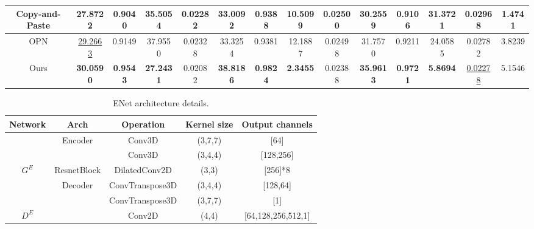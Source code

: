 \begin{table}[t]
{\begin{tabular}{c|c|c|c|c|c|c|c|c|c|c|c|c|c }
			Copy-and-Paste \cite{lee2019copy}&
			27.8722 &   0.9040 &  35.5054 & 0.02282 &
			
			33.0092 &  0.9388 &  10.5099 & 0.02500 & 
			
			30.2559 & 0.9106 & 31.3721 & 0.02968 
			& 1.4741
			\\
			
			\hline
			
			
			OPN \cite{oh2019onion} & \underline{29.2663} &0.9149 & 37.9550 &0.02328 &
			
			33.3254 & 0.9381  & 12.1887 &0.02498 &
			
			31.7570  & 0.9211 & 24.0585 
			&0.02782 &
			3.8239 \\
			
			
			\hline
			
			
			
			Ours &\textbf{30.0590} &\textbf{0.9543}&   \textbf{27.2431} & 0.02082 &
			\textbf{38.8186} & \textbf{0.9824} & \textbf{2.3455} & 0.02388 &
			\textbf{35.9613}  & \textbf{0.9721}&  \textbf{ 5.8694}  & \underline{0.02278}  &5.1546\\
			
			\hline
		\end{tabular}
	}
	\label{tab:sem}
\end{table}


\begin{table}[t]
	\caption{ENet architecture details. }\smallskip
	\scriptsize
	\centering
	{
		\smallskip\begin{tabular}{c|c|c|c|c}
			\hline\hline
			\textbf{Network} & \textbf{Arch} & \textbf{Operation} & \textbf{Kernel size} & \textbf{Output channels}  \\ \hline \hline
			&\multirow{2}{*}{ Encoder} &	Conv3D  & (3,7,7) & [64]  \\ \cline{3-5}
			
			& & 	Conv3D &  (3,4,4) & [128,256]  \\ 
			\cline{2-5}
			$G^E$	& ResnetBlock & DilatedConv2D &  (3,3) &[256]*8 \\ 
			\cline{2-5}
			& \multirow{2}{*}{Decoder} & 	ConvTranspose3D &  (3,4,4) & [128,64]  \\ \cline{3-5}
			& & 	ConvTranspose3D &  (3,7,7) & [1]  \\ \hline \hline
			
			$D^E$& & Conv2D & (4,4) & [64,128,256,512,1] \\ \hline
			
		\end{tabular}
	}
	\label{tab:enet-arch1}
\end{table}


